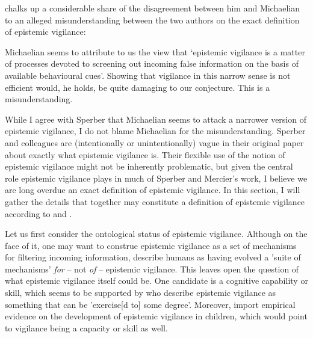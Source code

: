 \citet{Sperber13} chalks up a considerable share of the disagreement between him and Michaelian to an alleged misunderstanding between the two authors on the exact definition of epistemic vigilance:
\begin{quoting}
    Michaelian seems to attribute to us the view that ‘epistemic vigilance is a matter of processes devoted to screening out incoming false information on the basis of available behavioural cues’. Showing that vigilance in this narrow sense is not efficient would, he holds, be quite damaging to our conjecture. This is a misunderstanding.
    \hfill \citep[p.~65]{Sperber13}
\end{quoting}
While I agree with Sperber that Michaelian seems to attack a narrower version of epistemic vigilance, I do not blame Michaelian for the misunderstanding. Sperber and colleagues are (intentionally or unintentionally) vague in their original paper about exactly what epistemic vigilance is.
Their flexible use of the notion of epistemic vigilance might not be inherently problematic, but given the central role epistemic vigilance plays in much of Sperber and Mercier's work, I believe we are long overdue an exact definition of epistemic vigilance. In this section, I will gather the details that together may constitute a definition of epistemic vigilance according to \citet{Sperber10} and \citet{Sperber13}.

Let us first consider the ontological status of epistemic vigilance. Although on the face of it, one may want to construe epistemic vigilance as a set of mechanisms for filtering incoming information, \citet{Sperber10} describe humans as having evolved a 'suite of mechanisms' \emph{for} -- not \emph{of} -- epistemic vigilance. This leaves open the question of what epistemic vigilance itself could be. One candidate is a cognitive capability or skill, which seems to be supported by \citet[p.~60]{MS11} who describe epistemic vigilance as something that can be 'exercise[d to] some degree'. Moreover, \citet[\S 5]{Sperber10} import empirical evidence on the development of epistemic vigilance in children, which would point to vigilance being a capacity or skill as well.

